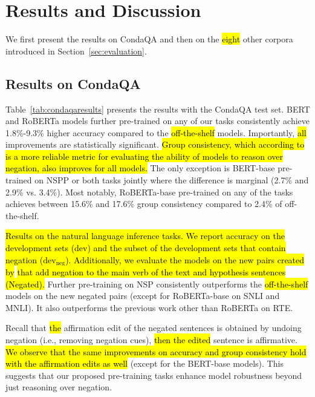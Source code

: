 \section{Results and Discussion}
\label{sec:results}

We first present the results on CondaQA and then on the \hl{eight} other corpora introduced in Section~\ref{sec:evaluation}.


\subsection{Results on CondaQA}
\label{sec:condaqaresults}

Table~\ref{tab:condaqaresults} presents the results with the CondaQA test set.
{BERT} and {RoBERTa} models further pre-trained on any of our tasks consistently achieve 1.8\%-9.3\% higher accuracy compared to the \hl{off-the-shelf} models. 
Importantly, \hl{all} improvements are statistically significant. 
\hl{Group consistency,
which according to} \citet{ravichander-etal-2022-condaqa} \hl{is a more reliable metric for evaluating the ability of models to reason over negation,
also improves for all models.}
The only exception is {BERT-base} pre-trained on NSPP or both tasks jointly where the difference is marginal (2.7\% and 2.9\% vs. 3.4\%).
Most notably, {RoBERTa-base} pre-trained on any of the tasks achieves between 15.6\% and 17.6\% group consistency compared to 2.4\% of off-the-shelf.

\begin{table*}[h!]
    \centering
    
    \caption{
        \hl{Results on the natural language inference tasks.
        We report accuracy on the development sets (dev) and the subset of the development sets that contain negation ($\text{dev}_{\text{neg}}$).
        Additionally, we evaluate the models on the new pairs created by }\citet{hossain-etal-2020-analysis}\hl{ that add negation to the main verb of the text and hypothesis sentences (Negated).}
        Further pre-training on NSP consistently outperforms the \hl{off-the-shelf} models on the new negated pairs (except for {RoBERTa-base} on SNLI and MNLI).
        It also outperforms the previous work other than {RoBERTa} on RTE.
        \label{tab:nliresults}
    }
\end{table*}
Recall that \hl{the} affirmation edit of the negated sentences is obtained by undoing negation (i.e., removing negation cues),
\hl{then the edited} sentence is affirmative.
\hl{We observe that the same improvements on accuracy and group consistency hold with the affirmation edits as well} (except for the {BERT-base} models).
This suggests that our proposed pre-training tasks enhance model robustness beyond just reasoning over negation.


